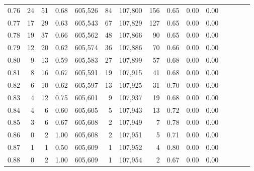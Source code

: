 \begin{tabular}{rrrcrrrrrrrrrrr}
0.76 &      24 &     51 &                                       0.68 &  605,526 &       84 &  107,800 &      156 &  0.65 &  0.00 &                         0.00 \\
0.77 &      17 &     29 &                                       0.63 &  605,543 &       67 &  107,829 &      127 &  0.65 &  0.00 &                         0.00 \\
0.78 &      19 &     37 &                                       0.66 &  605,562 &       48 &  107,866 &       90 &  0.65 &  0.00 &                         0.00 \\
0.79 &      12 &     20 &                                       0.62 &  605,574 &       36 &  107,886 &       70 &  0.66 &  0.00 &                         0.00 \\
0.80 &       9 &     13 &                                       0.59 &  605,583 &       27 &  107,899 &       57 &  0.68 &  0.00 &                         0.00 \\
0.81 &       8 &     16 &                                       0.67 &  605,591 &       19 &  107,915 &       41 &  0.68 &  0.00 &                         0.00 \\
0.82 &       6 &     10 &                                       0.62 &  605,597 &       13 &  107,925 &       31 &  0.70 &  0.00 &                         0.00 \\
0.83 &       4 &     12 &                                       0.75 &  605,601 &        9 &  107,937 &       19 &  0.68 &  0.00 &                         0.00 \\
0.84 &       4 &      6 &                                       0.60 &  605,605 &        5 &  107,943 &       13 &  0.72 &  0.00 &                         0.00 \\
0.85 &       3 &      6 &                                       0.67 &  605,608 &        2 &  107,949 &        7 &  0.78 &  0.00 &                         0.00 \\
0.86 &       0 &      2 &                                       1.00 &  605,608 &        2 &  107,951 &        5 &  0.71 &  0.00 &                         0.00 \\
0.87 &       1 &      1 &                                       0.50 &  605,609 &        1 &  107,952 &        4 &  0.80 &  0.00 &                         0.00 \\
0.88 &       0 &      2 &                                       1.00 &  605,609 &        1 &  107,954 &        2 &  0.67 &  0.00 &                         0.00 \\

\end{tabular}
